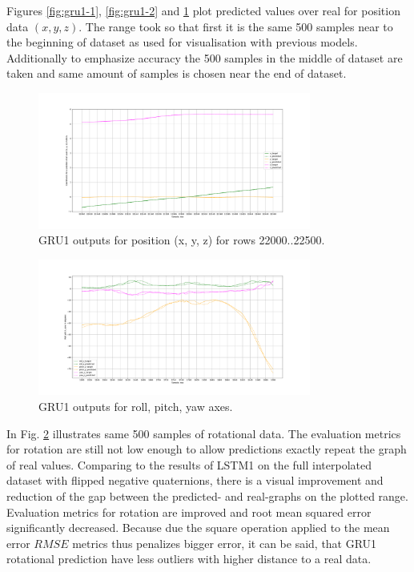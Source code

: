 Figures \ref{fig:gru1-1},  \ref{fig:gru1-2} and \ref{fig:gru1-3} plot predicted values over real for position data $(x, y, z)$. The range took so that first it is the same 500 samples near to the beginning of dataset as used for visualisation with previous models. Additionally to emphasize accuracy the 500 samples in the middle of dataset are taken and same amount of samples is chosen near the end of dataset. 
\begin{figure}[t!]
	\begin{center}
		\includegraphics[width=0.8\textwidth, keepaspectratio]{gfx/gru1-xyz_position_21000.pdf}
		\caption{GRU1 outputs for position (x, y, z) for rows 22000..22500.}
		\label{fig:gru1-3}
	\end{center}
\end{figure}
\begin{figure}[t!]
	\begin{center}
		\includegraphics[width=0.8\textwidth, keepaspectratio]{gfx/gru1-roll_pitch_yaw_accuracy.pdf}
		\caption{GRU1 outputs for roll, pitch, yaw axes.}
		\label{fig:gru1-4}
	\end{center}
\end{figure}
In Fig. \ref{fig:gru1-4} illustrates same 500 samples of rotational data. The evaluation metrics for rotation are still not low enough to allow predictions exactly repeat the graph of real values. Comparing to the results of LSTM1 on the full interpolated dataset with flipped negative quaternions, there is a visual improvement and reduction of the gap between the predicted- and real-graphs on the plotted range. Evaluation metrics for rotation are improved and root mean squared error significantly decreased. Because due the square operation applied to the mean error $RMSE$ metrics thus penalizes bigger error, it can be said, that GRU1 rotational prediction have less outliers with higher distance to a real data. 

